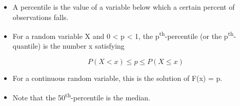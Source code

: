 \documentclass[12pt]{report}
\renewcommand{\_}{\kern-1.5pt\textunderscore\kern-1.5pt}
\begin{document}
\begin{itemize}
	\item A percentile is the value of a variable below which a certain percent of observations falls.\par

	\item For a random variable X and 0 < p < 1, the p\textsuperscript{th}-percentile (or the p\textsuperscript{th}-quantile) is the number x satisfying \par

 \[ P \left( X<x \right)  \leq p \leq P \left( X \leq x \right)  \] \par

	\item For a continuous random variable, this is the solution of F(x) = p.\par

	\item Note that the 50\textsuperscript{th}-percentile is the median.
\end{itemize}\par
\end{document}
